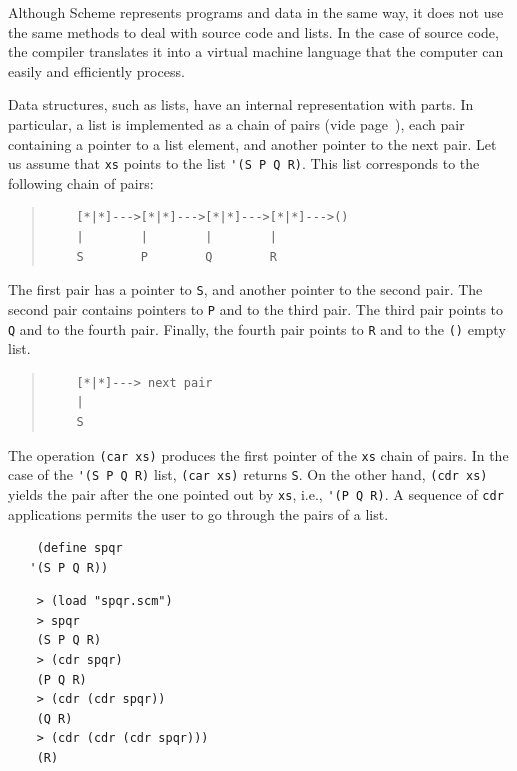 \documentclass[a4paper,12pt]{book}
\newenvironment{fmpage}[1]
{\begin{lrbox}{\fmbox}\begin{minipage}{#1}}
{\end{minipage}\end{lrbox}\fbox{\usebox{\fmbox}}}
\begin{document}
Although Scheme represents programs and
data in the same way, it does not use
the same methods to deal with source
code and lists. In the case of source
code, the compiler translates it into
a virtual machine language that the
computer can easily and efficiently
process.

Data structures, such as lists, have
an internal representation with parts. 
In particular, a list is implemented
as a chain of pairs 
(vide page~\pageref{page:cartesian-pair}),
each pair containing
a pointer to a list element,
and another pointer to the next pair. 
Let us assume that
\verb|xs| points to the list
\verb|'(S P Q R)|.
This list corresponds to the following
chain of pairs:
\begin{quote}
	\begin{verbatim}
	[*|*]--->[*|*]--->[*|*]--->[*|*]--->()
	|        |        |        |        
	S        P        Q        R       
	\end{verbatim}
\end{quote}
The first pair has a pointer to \verb|S|,
and another pointer to the second pair.
The second pair contains pointers to 
\verb|P| and to the third pair. 
The third pair points to \verb|Q| and
to the fourth pair. Finally, the fourth
pair points to \verb|R| and to 
the \verb|()| empty list.

\begin{quote}
	\begin{verbatim}
	[*|*]---> next pair
	|        
	S      
	\end{verbatim}
\end{quote}
The operation \verb|(car xs)| produces
the first pointer of the \verb|xs| 
chain of pairs. In the case of
the \verb|'(S P Q R)| list, \verb|(car xs)|
returns \verb|S|. On the other hand,
\verb|(cdr xs)| yields the pair
after the one pointed out by \verb|xs|,
i.e., \verb|'(P Q R)|. A sequence
of \verb|cdr| applications permits the user to
go through the pairs of a list. \\

\begin{fmpage}{0.8\linewidth}
	\begin{verbatim}
	(define spqr
   '(S P Q R))
	\end{verbatim}
\end{fmpage}

\begin{fmpage}{0.8\linewidth}
	\begin{verbatim}
	> (load "spqr.scm")
	> spqr
	(S P Q R)
	> (cdr spqr)
	(P Q R)
	> (cdr (cdr spqr))
	(Q R)
	> (cdr (cdr (cdr spqr)))
	(R)
	\end{verbatim}
\end{fmpage}
\end{document}
